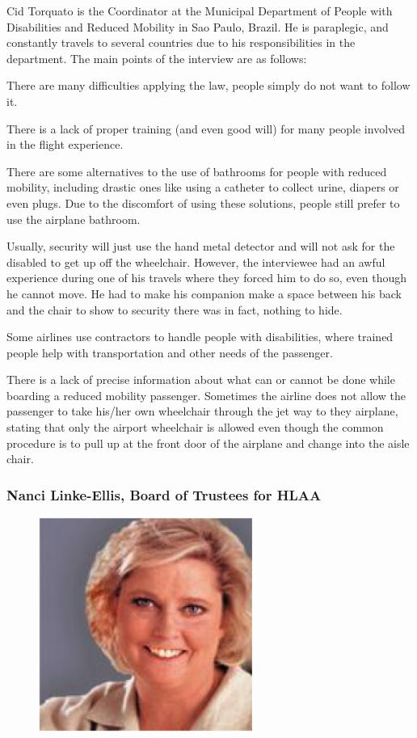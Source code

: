 Cid Torquato is the Coordinator at the Municipal Department of People with Disabilities and Reduced Mobility in Sao Paulo, Brazil. He is paraplegic, and constantly travels to several countries due to his responsibilities in the department. The main points of the interview are as follows:

\begin{list}{-}{}
  \item There are many difficulties applying the law, people simply do not want to follow it.
  \item There is a lack of proper training (and even good will) for many people involved in the flight experience.
  \item There are some alternatives to the use of bathrooms for people with reduced mobility, including drastic ones like using a catheter to collect urine, diapers or even plugs. Due to the discomfort of using these solutions, people still prefer to use the airplane bathroom.
  \item Usually, security will just use the hand metal detector and will not ask for the disabled to get up off the wheelchair. However, the interviewee had an awful experience during one of his travels where they forced him to do so, even though he cannot move. He had to make his companion make a space between his back and the chair to show to security there was in fact, nothing to hide.
  \item Some airlines use contractors to handle people with disabilities, where trained people help with transportation and other needs of the passenger.
  \item There is a lack of precise information about what can or cannot be done while boarding a reduced mobility passenger. Sometimes the airline does not allow the passenger to take his/her own wheelchair through the jet way to they airplane, stating that only the airport wheelchair is allowed even though the common procedure is to pull up at the front door of the airplane and change into the aisle chair. 
\end{list}

\subsubsection{Nanci Linke-Ellis, Board of Trustees for HLAA}

\begin{figure}[h]
  \centering
     \includegraphics[width=7cm]{images/image027}
  \label{fig:27}
\end{figure}

